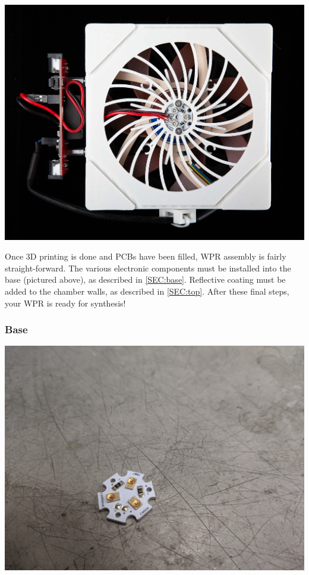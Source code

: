 \documentclass[11pt]{article}
\begin{document}
\includegraphics[width=\textwidth]{"./assembly-coverart.jpg"}

Once 3D printing is done and PCBs have been filled, WPR assembly is fairly straight-forward.
The various electronic components must be installed into the base (pictured above), as described in \autoref{SEC:base}.
Reflective coating must be added to the chamber walls, as described in \autoref{SEC:top}.
After these final steps, your WPR is ready for synthesis!

\clearpage
\subsubsection{Base} \label{SEC:base}

\begin{center}
  \includegraphics[width=\textwidth/2]{"./bare-led.jpg"}
\end{center}
\end{document}
